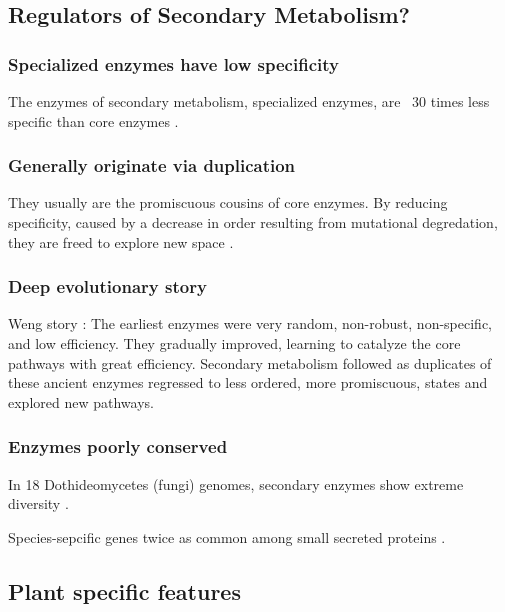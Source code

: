 \subsection{Regulators of Secondary Metabolism?}

\subsubsection{Specialized enzymes have low specificity}

    The enzymes of secondary metabolism, specialized enzymes, are ~30 times
    less specific than core enzymes \cite{bar-even_moderately_2011}.

\subsubsection{Generally originate via duplication}

    They usually are the promiscuous cousins of core enzymes. By reducing
    specificity, caused by a decrease in order resulting from mutational
    degredation, they are freed to explore new space \cite[review]{weng_rise_2012}.

\subsubsection{Deep evolutionary story}

    Weng story \cite{weng_rise_2012}: The earliest enzymes were very random,
    non-robust, non-specific, and low efficiency. They gradually improved,
    learning to catalyze the core pathways with great efficiency. Secondary
    metabolism followed as duplicates of these ancient enzymes regressed to
    less ordered, more promiscuous, states and explored new pathways.

\subsubsection{Enzymes poorly conserved}

    In 18 Dothideomycetes (fungi) genomes, secondary enzymes show extreme
    diversity \cite{ohm_diverse_2012}.

    Species-sepcific genes twice as common among small secreted proteins
    \cite{ohm_diverse_2012}. 

\subsection{Plant specific features}

